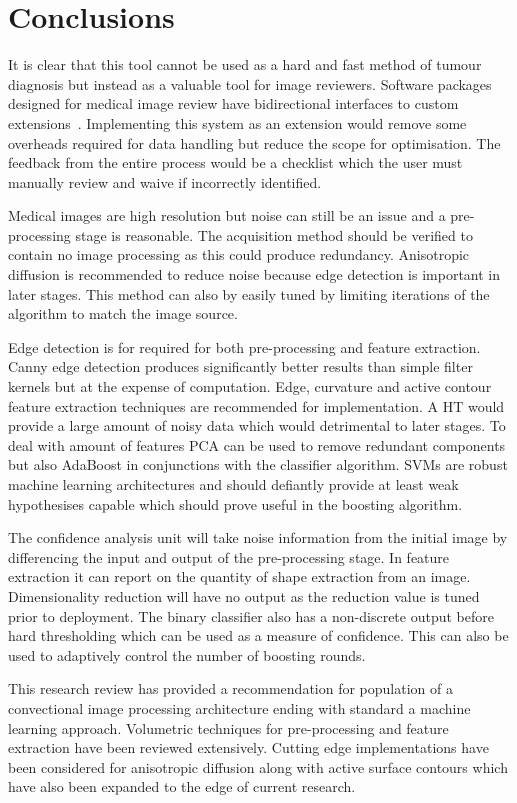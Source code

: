 \documentclass[journal]{IEEEtran}
\begin{document}
\section{Conclusions}
\label{sec:conclusions}

It is clear that this tool cannot be used as a hard and fast method of tumour diagnosis but instead as a valuable tool for image reviewers.
Software packages designed for medical image review have bidirectional interfaces to custom extensions~\cite{slicer}.
Implementing this system as an extension would remove some overheads required for data handling but reduce the scope for optimisation.
The feedback from the entire process would be a checklist which the user must manually review and waive if incorrectly identified.

Medical images are high resolution but noise can still be an issue and a pre-processing stage is reasonable.
The acquisition method should be verified to contain no image processing as this could produce redundancy.
Anisotropic diffusion is recommended to reduce noise because edge detection is important in later stages.
This method can also by easily tuned by limiting iterations of the algorithm to match the image source.

Edge detection is for required for both pre-processing and feature extraction.
Canny edge detection produces significantly better results than simple filter kernels but at the expense of computation.
Edge, curvature and active contour feature extraction techniques are recommended for implementation.
A HT would provide a large amount of noisy data which would detrimental to later stages.
To deal with amount of features PCA can be used to remove redundant components but also AdaBoost in conjunctions with the classifier algorithm.
SVMs are robust machine learning architectures and should defiantly provide at least weak hypothesises capable which should prove useful in the boosting algorithm. 


The confidence analysis unit will take noise information from the initial image by differencing the input and output of the pre-processing stage.
In feature extraction it can report on the quantity of shape extraction from an image. 
Dimensionality reduction will have no output as the reduction value is tuned prior to deployment.
The binary classifier also has a non-discrete output before hard thresholding which can be used as a measure of confidence.
This can also be used to adaptively control the number of boosting rounds.


This research review has provided a recommendation for population of a convectional image processing architecture ending with standard a machine learning approach.
Volumetric techniques for pre-processing and feature extraction have been reviewed extensively. 
Cutting edge implementations have been considered for anisotropic diffusion along with active surface contours which have also been expanded to the edge of current research.




\end{document}
